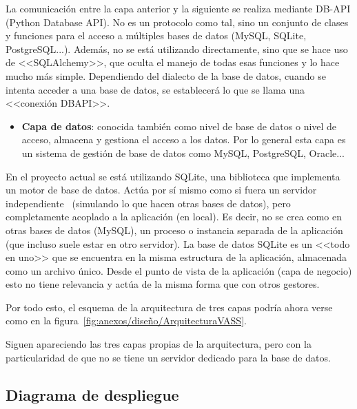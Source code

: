La comunicación entre la capa anterior y la siguiente se realiza mediante DB-API
(Python Database API). No es un protocolo como tal, sino un conjunto de clases y
funciones para el acceso a múltiples bases de datos (MySQL, SQLite,
PostgreSQL...). Además, no se está utilizando directamente, sino que se hace uso
de <<SQLAlchemy>>, que oculta el manejo de todas esas funciones y lo hace mucho
más simple. Dependiendo del dialecto de la base de datos, cuando se intenta
acceder a una base de datos, se establecerá lo que se llama una <<conexión
DBAPI>>.

\begin{itemize}
    \item \textbf{Capa de datos}: conocida también como nivel de base de datos o
    nivel de acceso, almacena y gestiona el acceso a los datos. Por lo general
    esta capa es un sistema de gestión de base de datos como MySQL, PostgreSQL,
    Oracle...
\end{itemize}


En el proyecto actual se está utilizando SQLite, una biblioteca que implementa
un motor de base de datos. Actúa por sí mismo como si fuera un servidor
independiente~\cite{sqlite} (simulando lo que hacen otras bases de datos), pero
completamente acoplado a la aplicación (en local). Es decir, no se crea como en
otras bases de datos (MySQL), un proceso o instancia separada de la aplicación
(que incluso suele estar en otro servidor). La base de datos SQLite es un <<todo
en uno>> que se encuentra en la misma estructura de la aplicación, almacenada
como un archivo único. Desde el punto de vista de la aplicación (capa de
negocio) esto no tiene relevancia y actúa de la misma forma que con otros
gestores.

Por todo esto, el esquema de la arquitectura de tres capas podría ahora verse
como en la figura~\ref{fig:anexos/diseño/ArquitecturaVASS}.


Siguen apareciendo las tres capas propias de la arquitectura, pero con la
particularidad de que no se tiene un servidor dedicado para la base de datos.

\clearpage
\subsection{Diagrama de despliegue}


